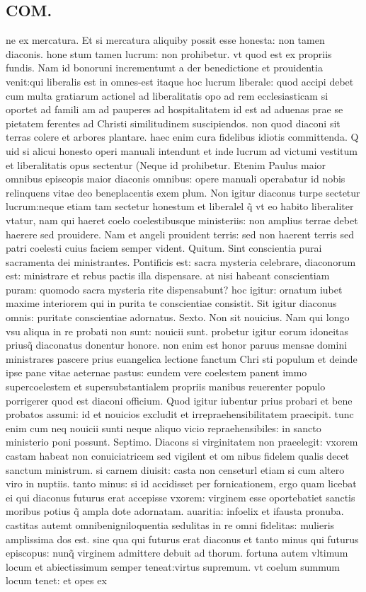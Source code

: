 \documentclass{article}
\begin{document}
\begin{pages}
\section*{COM. }
\marginpar{[ p.3 ]}\pstart ne ex mercatura. Et si mercatura aliquiby possit esse honesta: non tamen diaconis. hone stum tamen lucrum: non prohibetur. vt quod est ex propriis fundis. Nam id bonoruni incrementumt a der benedictione et prouidentia venit:qui liberalis est in omnes-est itaque  hoc lucrum liberale: quod accipi debet cum multa gratiarum actionel ad liberalitatis opo ad rem ecclesiasticam si oportet ad famili am ad pauperes ad hospitalitatem id est ad aduenas prae se pietatem ferentes ad Christi similitudinem suscipiendos. non quod diaconi sit terras colere et arbores plantare. haec enim cura fidelibus idiotis committenda. Q uid si alicui honesto operi manuali intendunt et inde lucrum ad victumi vestitum et liberalitatis opus sectentur (Neque id prohibetur. Etenim Paulus maior omnibus episcopis maior diaconis omnibus: opere manuali operabatur id nobis relinquens vitae deo beneplacentis exem plum. Non igitur diaconus turpe sectetur lucrum:neque etiam tam sectetur honestum et liberalel q̃ vt eo habito liberaliter vtatur, nam qui haeret coelo coelestibusque ministeriis: non amplius terrae debet haerere sed prouidere. Nam et angeli prouident terris: sed non haerent terris sed patri coelesti cuius faciem semper vident. Quitum. Sint conscientia purai sacramenta dei ministrantes. Pontificis est: sacra mysteria celebrare, diaconorum est: ministrare et rebus pactis illa dispensare. at nisi habeant conscientiam puram: quomodo sacra mysteria rite dispensabunt? hoc igitur: ornatum iubet maxime interiorem qui in purita te conscientiae consistit. Sit igitur diaconus omnis: puritate conscientiae adornatus. Sexto. Non sit nouicius. Nam qui longo vsu aliqua in re probati non sunt: nouicii sunt. probetur igitur eorum idoneitas priusq̃ diaconatus donentur honore. non enim est honor paruus mensae domini ministrares pascere prius euangelica lectione fanctum Chri sti populum et deinde ipse pane vitae aeternae pastus: eundem vere coelestem panent immo supercoelestem et supersubstantialem propriis manibus reuerenter populo porrigerer quod est diaconi officium. Quod igitur iubentur prius probari et bene probatos assumi: id et nouicios excludit et irrepraehensibilitatem praecipit. tunc enim cum neq nouicii sunti neque aliquo vicio repraehensibiles: in sancto ministerio poni possunt. Septimo. Diacons si virginitatem non praeelegit: vxorem castam habeat non conuiciatricem sed vigilent et om nibus fidelem qualis decet sanctum ministrum. si carnem diuisit: casta non censeturl etiam si cum altero viro in nuptiis. tanto minus: si id accidisset per fornicationem, ergo quam licebat ei qui diaconus futurus erat accepisse vxorem: virginem esse oportebatiet sanctis moribus potius q̃ ampla dote adornatam. auaritia: infoelix et ifausta pronuba. castitas autemt omnibenigniloquentia sedulitas in re omni fidelitas: mulieris amplissima dos est. sine qua qui futurus erat diaconus et tanto minus qui futurus episcopus: nunq̃ virginem admittere debuit ad thorum. fortuna autem vltimum locum et abiectissimum semper teneat:virtus supremum. vt coelum summum locum tenet: et opes ex 
\end{pages}
\end{document}
